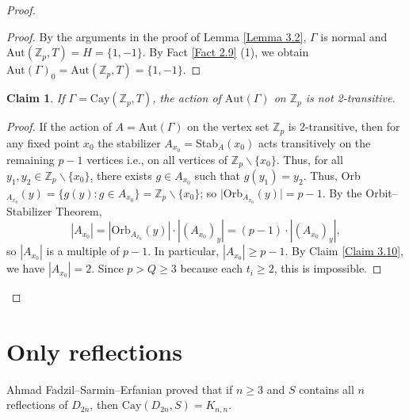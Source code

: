 \documentclass[12pt,reqno,a4paper]{amsart}
\theoremstyle{definition}
\newtheorem{corr}[defn]{Corollary}
\newtheorem{claim}[defn]{Claim}
\begin{document}
\begin{proof}
\begin{proof}
By the arguments in the proof of Lemma \ref{Lemma 3.2},  $\Gamma$ 
is normal and $\mathrm{Aut}(\mathbb{Z}_p,T)=H=\{1,-1\}$.
By Fact \ref{Fact 2.9} (1),
we obtain
$\mathrm{Aut}(\Gamma)_0=\mathrm{Aut}(\mathbb{Z}_p,T)
   =\{1,-1\}$.
 \end{proof}

\begin{claim}\label{Claim 3.11}
{\em If $\Gamma = \mathrm{Cay}(\mathbb{Z}_p,T)$, the action of $\mathrm{Aut}(\Gamma)$ on $\mathbb{Z}_{p}$ is not 2-transitive.
}
\end{claim}

\begin{proof}
If the action of $A=\mathrm{Aut}(\Gamma)$ on the vertex set $\mathbb{Z}_{p}$ is 2-transitive, then for any fixed point $x_0$ the stabilizer $A_{x_0}=$Stab$_{A}(x_{0})$ acts transitively on the remaining $p-1$ vertices i.e., on all vertices of $\mathbb{Z}_{p}\backslash\{x_{0}\}$.  
Thus, for all $y_{1},y_{2}\in \mathbb{Z}_{p}\backslash\{x_{0}\}$, there exists $g\in A_{x_{0}}$ such that $g(y_{1})=y_{2}$.
Thus, Orb$_{A_{x_{0}}}(y)=\{g(y):g\in A_{x_{0}}\}=\mathbb{Z}_{p}\backslash \{x_{0}\}$; so $\vert$Orb$_{A_{x_{0}}}(y)\vert=p-1$.
By the Orbit--Stabilizer Theorem,
\[
|A_{x_0}| = |\mathrm{Orb}_{A_{x_0}}(y)| \cdot |(A_{x_0})_y| 
          = (p-1)\cdot |(A_{x_0})_y|,
\]
so $|A_{x_0}|$ is a multiple of $p-1$. 
In particular, $|A_{x_0}| \ge p-1$.
By Claim \ref{Claim 3.10}, we have $|A_{x_0}|= 2$.
Since $p>Q\geq 3$ because each $t_{i}\geq 2$, this is impossible.
 \end{proof}
 \end{proof}

\section{Only reflections}


Ahmad Fadzil--Sarmin--Erfanian \cite[Proposition 2]{ASE2019} proved that if $n\geq 3$ and $S$ contains all $n$ reflections of $D_{2n}$, then $\text{Cay}(D_{2n}, S)=K_{n,n}$. 
\end{document}
